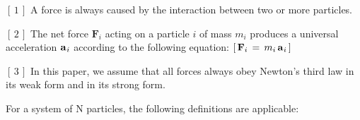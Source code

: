 \documentclass[10pt]{article}
\begin{document}
\par \bigskip\smallskip \noindent $[\,1\,]$ A force is always caused by the interaction between two or more particles.

\par \bigskip \noindent $[\,2\,]$ The net force ${\mathbf{F}}_i$ acting on a particle $i$ of mass $m_i$ produces a universal acceleration ${\mathbf{a}}_{\hspace{+0.045em}i}$ according to the following equation: $[ \, {\mathbf{F}}_i \,=\, m_i \, {\mathbf{a}}_{\hspace{+0.045em}i} \, ]$

\par \bigskip \noindent $[\,3\,]$ In this paper, we assume that all forces always obey Newton's third law in its weak form and in its strong form.

\newpage

\par {}

\par \bigskip \noindent For a system of N particles, the following definitions are applicable:
\end{document}
